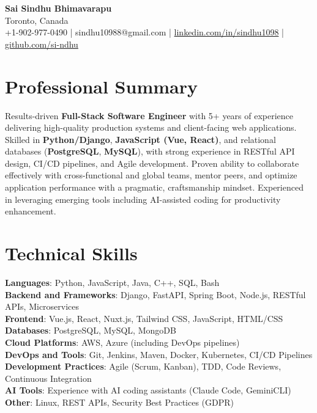 \documentclass[letterpaper,11pt]{article}
\begin{document}
\begin{center}
  {\Large \textbf{Sai Sindhu Bhimavarapu}} \\
  Toronto, Canada \\
  +1-902-977-0490 \enspace | \enspace sindhu10988@gmail.com \enspace | \enspace \href{https://www.linkedin.com/in/sindhu1098/}{linkedin.com/in/sindhu1098} \enspace | \enspace \href{https://github.com/si-ndhu}{github.com/si-ndhu}
\end{center}

\section{Professional Summary}
  \begin{itemize}[leftmargin=0.15in, label={}]
    \small{\item{
     Results-driven \textbf{Full-Stack Software Engineer} with 5+ years of experience delivering high-quality production systems and client-facing web applications. Skilled in \textbf{Python/Django}, \textbf{JavaScript (Vue, React)}, and relational databases (\textbf{PostgreSQL}, \textbf{MySQL}), with strong experience in RESTful API design, CI/CD pipelines, and Agile development. Proven ability to collaborate effectively with cross-functional and global teams, mentor peers, and optimize application performance with a pragmatic, craftsmanship mindset. Experienced in leveraging emerging tools including AI-assisted coding for productivity enhancement. 
    }}
  \end{itemize}
\vspace{-16pt}

\section{Technical Skills}
 \begin{itemize}[leftmargin=0.15in, label={}]
    \small{\item{
     \textbf{Languages}: Python, JavaScript, Java, C++, SQL, Bash \\
     \textbf{Backend and Frameworks}: Django, FastAPI, Spring Boot, Node.js, RESTful APIs, Microservices \\
     \textbf{Frontend}: Vue.js, React, Nuxt.js, Tailwind CSS, JavaScript, HTML/CSS \\
     \textbf{Databases}: PostgreSQL, MySQL, MongoDB \\
     \textbf{Cloud Platforms}: AWS, Azure (including DevOps pipelines) \\
     \textbf{DevOps and Tools}: Git, Jenkins, Maven, Docker, Kubernetes, CI/CD Pipelines \\
     \textbf{Development Practices}: Agile (Scrum, Kanban), TDD, Code Reviews, Continuous Integration \\
     \textbf{AI Tools}: Experience with AI coding assistants (Claude Code, GeminiCLI) \\
     \textbf{Other}: Linux, REST APIs, Security Best Practices (GDPR)
    }}
 \end{itemize}
\vspace{-16pt}
\end{document}
